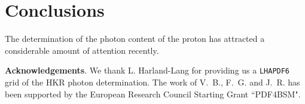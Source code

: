 \section{Conclusions}

\label{sec:conclusions}

The determination of the photon content of the proton has
attracted a considerable amount of attention recently.


{\bf Acknowledgements}.
%
We thank L. Harland-Lang for providing us a {\tt LHAPDF6} grid
of the HKR photon determination.
%
The work of V.~B., F.~G. and J.~R. has been supported
by the European Research Council Starting Grant ``PDF4BSM".



